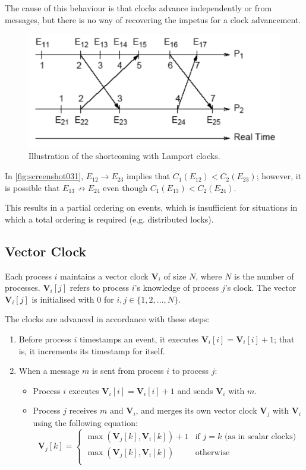 The cause of this behaviour is that clocks advance independently or from messages, but there is no way of recovering the impetus for a clock advancement.

\begin{figure}
\centering
\includegraphics[width=0.7\linewidth]{screenshot031}
\caption{Illustration of the shortcoming with Lamport clocks.}
\label{fig:screenshot031}
\end{figure}

In \autoref{fig:screenshot031}, $E_{12} \rightarrow E_{23}$ implies that $C_1(E_{12}) < C_2(E_{23})$; however, it is possible that $E_{13} \not\rightarrow E_{24}$ even though $C_1(E_{13}) < C_2(E_{24})$.

This results in a partial ordering on events, which is insufficient for situations in which a total ordering is required (e.g. distributed locks).

\subsection{Vector Clock}
Each process $i$ maintains a vector clock $\mathbf{V}_i$ of size $N$, where $N$ is the number of processes. $\mathbf{V}_i[j]$ refers to process $i$'s knowledge of process $j$'s clock. The vector $\mathbf{V}_i[j]$ is initialised with $0$ for $i, j \in \{1, 2, \dots, N\}$.

The clocks are advanced in accordance with these steps:
\begin{enumerate}
\item Before process $i$ timestamps an event, it executes $\mathbf{V}_i[i] = \mathbf{V}_i[i] + 1$; that is, it increments its timestamp for itself.
\item When a message $m$ is sent from process $i$ to process $j$: \begin{itemize}
	\item Process $i$ executes $\mathbf{V}_i[i] = \mathbf{V}_i[i] + 1$ and sends $\mathbf{V}_i$ with $m$.
	\item Process $j$ receives $m$ and $\mathbf{V}_i$, and merges its own vector clock $\mathbf{V}_j$ with $\mathbf{V}_i$ using the following equation:
	\[ \mathbf{V}_j[k] = 
		\begin{cases} 
			\max(\mathbf{V}_j[k], \mathbf{V}_i[k]) + 1 & \text{if } j = k \text{ (as in scalar clocks)} \\
			\max(\mathbf{V}_j[k], \mathbf{V}_i[k]) & \text{otherwise} \\
		\end{cases}
	\]
\end{itemize}
\end{enumerate}

